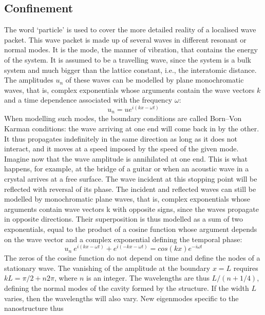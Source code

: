 \subsection{Confinement}
The word ‘particle’ is used to cover the more detailed reality of a localised wave
packet. This wave packet is made up of several waves in different resonant or normal
modes. It is the mode, the manner of vibration, that contains the energy of the
system. It is assumed to be a travelling wave, since the system is a bulk system and
much bigger than the lattice constant, i.e., the interatomic distance. The amplitudes
$u_n$ of these waves can be modelled by plane monochromatic waves, that is, complex
exponentials whose arguments contain the wave vectors $k$ and a time dependence associated with the frequency $\omega$:
\begin{equation*}
u_n=ue^{i(kx-\omega t)}
\end{equation*}
When modelling such modes, the boundary conditions are called Born–Von Karman
conditions: the wave arriving at one end will come back in by the other. It thus
propagates indefinitely in the same direction as long as it does not interact, and it
moves at a speed imposed by the speed of the given mode.\\
\indent Imagine now that the wave amplitude is annihilated at one end. This is what happens,
for example, at the bridge of a guitar or when an acoustic wave in a crystal
arrives at a free surface. The wave incident at this stopping point will be reflected
with reversal of its phase. The incident and reflected waves
can still be modelled by monochromatic plane waves, that is, complex exponentials
whose arguments contain wave vectors k with opposite signs, since the waves propagate
in opposite directions. Their superposition is thus modelled as a sum of two
exponentials, equal to the product of a cosine function whose argument depends on
the wave vector and a complex exponential defining the temporal phase:
\begin{equation*}
u_n ~ e^{i(kx-\omega t)}+e^{i(-kx-\omega t)}= cos(kx)e^{-i \omega t}
\end{equation*}
The zeros of the cosine function do not depend on time and define the nodes of a
stationary wave. The vanishing of the amplitude at the boundary $x=L$ requires $kL=\pi /2+n2\pi$, where $n$ is an integer\cite{mingo2005carbon}. The wavelengths are thus $L/(n+1/4)$, defining
the normal modes of the cavity formed by the structure. If the width $L$ varies, then
the wavelengths will also vary. New eigenmodes specific to the nanostructure thus
